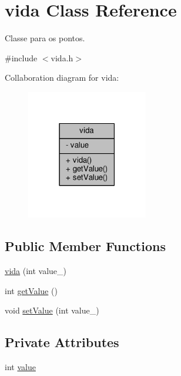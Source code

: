 \hypertarget{classvida}{}\section{vida Class Reference}
\label{classvida}


Classe para os pontos.  




{\ttfamily \#include $<$vida.\+h$>$}



Collaboration diagram for vida\+:
\nopagebreak
\begin{figure}[H]
\begin{center}
\leavevmode
\includegraphics[width=150pt]{classvida__coll__graph}
\end{center}
\end{figure}
\subsection*{Public Member Functions}
\begin{DoxyCompactItemize}
\item 
\hyperlink{classvida_ad384ba4be61ab721939ebd0a7ed818b8}{vida} (int value\+\_\+)
\item 
int \hyperlink{classvida_aff59d5fa0f254f27c938bf26d5ea69d1}{get\+Value} ()
\item 
void \hyperlink{classvida_a0aa2965112fb4a5cd4497a2fc4d01544}{set\+Value} (int value\+\_\+)
\end{DoxyCompactItemize}
\subsection*{Private Attributes}
\begin{DoxyCompactItemize}
\item 
int \hyperlink{classvida_ae9dec2f5055b4b7b7a67be0d3c344ba4}{value}
\end{DoxyCompactItemize}


